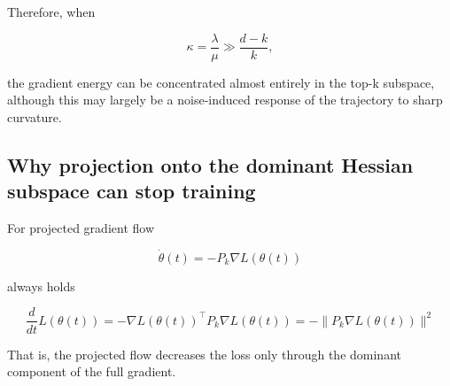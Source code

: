 \documentclass[conference]{IEEEtran}
\begin{document}
Therefore, when

\[
\kappa = \frac{\lambda}{\mu} \gg \frac{d-k}{k},
\]

the gradient energy can be concentrated almost entirely in the top-k subspace, although this may largely be a noise-induced response of the trajectory to sharp curvature.

\subsection{Why projection onto the dominant Hessian subspace can stop training}

For projected gradient flow

\[
\dot\theta(t) = -P_k\nabla L(\theta(t))
\]

always holds

\[
\frac{d}{dt}L(\theta(t)) = -\nabla L(\theta(t))^\top P_k \nabla L(\theta(t)) = - \|P_k \nabla L(\theta(t))\|^2
\]

That is, the projected flow decreases the loss only through the dominant component of the full gradient.
\end{document}
